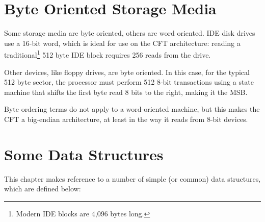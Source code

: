\section{Byte Oriented Storage Media}

Some storage media are byte oriented, others are word oriented. IDE
disk drives use a 16-bit word, which is ideal for use on the CFT
architecture: reading a traditional\footnote{Modern IDE blocks are
  4,096 bytes long.} 512 byte IDE block requires 256 reads from the
drive.

Other devices, like floppy drives, are byte oriented. In this case, for
the typical 512 byte sector, the processor must perform 512 8-bit
transactions using a state machine that shifts the first byte read 8
bits to the right, making it the MSB.

Byte ordering terms do not apply to a word-oriented machine, but this
makes the CFT a big-endian architecture, at least in the way it reads
from 8-bit devices.

\section{Some Data Structures}

This chapter makes reference to a number of simple (or common) data
structures, which are defined below:

